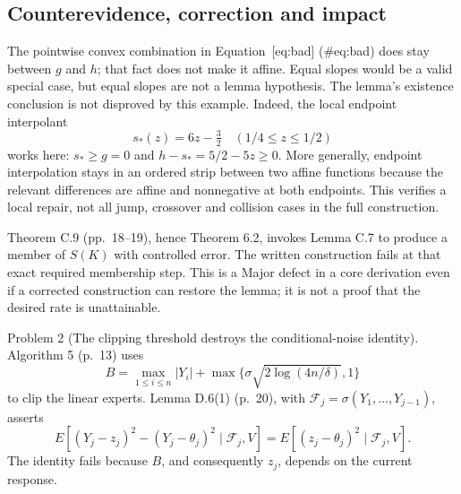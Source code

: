\documentclass[10pt]{article}
\begin{document}
\subsection*{Counterevidence, correction and impact}
The pointwise convex combination in Equation [eq:bad] (\#eq:bad) does stay between \(g\) and \(h\); that fact does not make it affine. Equal slopes would be a valid special case, but equal slopes are not a lemma hypothesis. The lemma’s existence conclusion is not disproved by this example. Indeed, the local endpoint interpolant \[s_*(z)=6z-\tfrac32\quad (1/4\le z\le1/2)\] works here: \(s_*\ge g=0\) and \(h-s_*=5/2-5z\ge0\). More generally, endpoint interpolation stays in an ordered strip between two affine functions because the relevant differences are affine and nonnegative at both endpoints. This verifies a local repair, not all jump, crossover and collision cases in the full construction.\par
Theorem C.9 (pp. 18–19), hence Theorem 6.2, invokes Lemma C.7 to produce a member of \(S(K)\) with controlled error. The written construction fails at that exact required membership step. This is a Major defect in a core derivation even if a corrected construction can restore the lemma; it is not a proof that the desired rate is unattainable.\par
Problem 2 (The clipping threshold destroys the conditional-noise identity).  Algorithm 5 (p. 13) uses \[B=\max_{1\le i\le n}|Y_i|+
 \max\{\sigma\sqrt{2\log(4n/\delta)},1\}\] to clip the linear experts. Lemma D.6(1) (p. 20), with \(\mathcal F_j=\sigma(Y_1,\ldots,Y_{j-1})\), asserts \[E[(Y_j-z_j)^2-(Y_j-\theta_j)^2\mid\mathcal F_j,V]
 =E[(z_j-\theta_j)^2\mid\mathcal F_j,V].\] The identity fails because \(B\), and consequently \(z_j\), depends on the current response.\par
\end{document}
